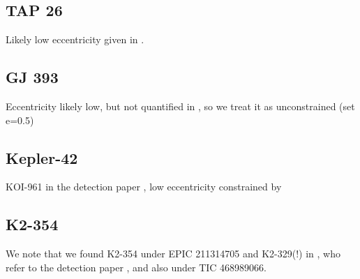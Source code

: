 \documentclass[twocolumn]{aastex631}
\begin{document}
\subsection{TAP 26}
Likely low eccentricity given in \cite{yu2017hot}.

\subsection{GJ 393}
Eccentricity likely low, but not quantified in \cite{amado2021carmenes}, so we treat it as unconstrained (set e=0.5)

\subsection{Kepler-42}
 KOI-961 in the detection paper \cite{muirhead2012characterizing}, low eccentricity constrained by \cite{mann2017gold}


\subsection{K2-354}
We note that we found K2-354 under EPIC 211314705 and K2-329(!) in \cite{bouma2020cluster}, who refer to the detection paper \cite{pope2016transiting}, and also under TIC 468989066.
\end{document}
